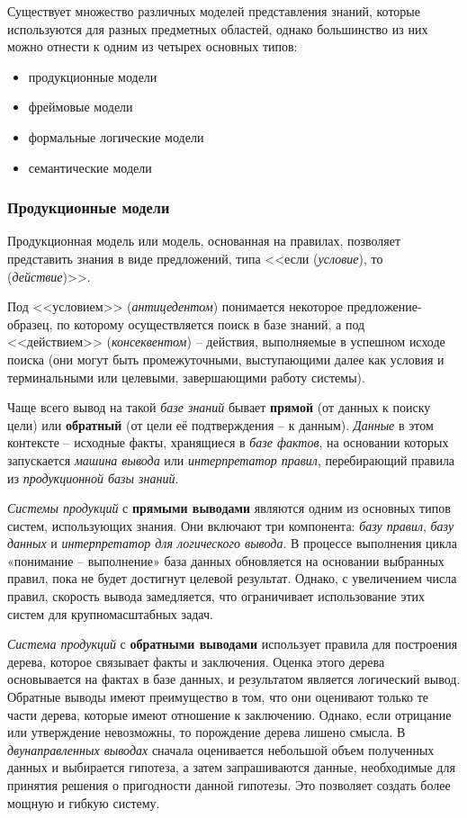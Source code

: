 Существует множество различных моделей представления знаний, которые используются для разных предметных областей, однако большинство из них можно отнести к одним из четырех основных типов:
\begin{itemize}
    \item продукционные модели
    \item фреймовые модели
    \item формальные логические модели
    \item семантические модели \cite[с.~14-15]{Model_Baryshev}
\end{itemize}

\subsubsection{Продукционные модели}

Продукционная модель или модель, основанная на правилах, позволяет представить знания в виде предложений, типа <<если (\textit{условие}), то (\textit{действие})>>.

Под <<условием>> (\textit{антицедентом}) понимается некоторое предложение-образец, по которому осуществляется поиск в базе знаний, а под <<действием>> (\textit{консеквентом}) -- действия, выполняемые в успешном исходе поиска (они могут быть промежуточными, выступающими далее как условия и терминальными или целевыми, завершающими работу системы).

Чаще всего вывод на такой \textit{базе знаний} бывает \textbf{прямой} (от данных к поиску цели) или \textbf{обратный} (от цели её подтверждения -- к данным). \textit{Данные} в этом контексте -- исходные факты, хранящиеся в \textit{базе фактов}, на основании которых запускается \textit{машина вывода} или \textit{интерпретатор правил}, перебирающий правила из \textit{продукционной базы знаний}. \cite[с.~21-22]{KBIS_Gavrilova}

\textit{Системы продукций} с \textbf{прямыми выводами} являются одним из основных типов систем, использующих знания. Они включают три компонента: \textit{базу правил}, \textit{базу данных} и \textit{интерпретатор для логического вывода}. В процессе выполнения цикла «понимание – выполнение» база данных обновляется на основании выбранных правил, пока не будет достигнут целевой результат. Однако, с увеличением числа правил, скорость вывода замедляется, что ограничивает использование этих систем для крупномасштабных задач.

\textit{Система продукций} с \textbf{обратными выводами} использует правила для построения дерева, которое связывает факты и заключения. Оценка этого дерева основывается на фактах в базе данных, и результатом является логический вывод. Обратные выводы имеют преимущество в том, что они оценивают только те части дерева, которые имеют отношение к заключению. Однако, если отрицание или утверждение невозможны, то порождение дерева лишено смысла. В \textit{двунаправленных выводах} сначала оценивается небольшой объем полученных данных и выбирается гипотеза, а затем запрашиваются данные, необходимые для принятия решения о пригодности данной гипотезы. Это позволяет создать более мощную и гибкую систему. 

